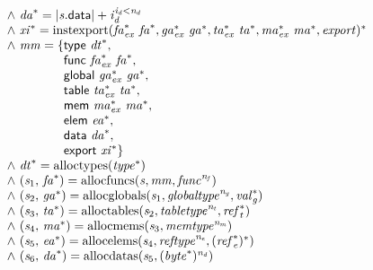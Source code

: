 $$\begin{array}{@{}lcl@{}l@{}}
 &&&\quad {\land}~{{\mathit{da}}^\ast} = {{|{\mathit{s}}.\mathsf{data}|} + {\mathit{i}}_{{\mathit{d}}}^{{\mathit{i}}_{{\mathit{d}}}<{\mathit{n}}_{{\mathit{d}}}}} \\
 &&&\quad {\land}~{{\mathit{xi}}^\ast} = {{\mathrm{instexport}}({{\mathit{fa}}_{{\mathit{ex}}}^\ast}~{{\mathit{fa}}^\ast}, {{\mathit{ga}}_{{\mathit{ex}}}^\ast}~{{\mathit{ga}}^\ast}, {{\mathit{ta}}_{{\mathit{ex}}}^\ast}~{{\mathit{ta}}^\ast}, {{\mathit{ma}}_{{\mathit{ex}}}^\ast}~{{\mathit{ma}}^\ast}, {\mathit{export}})^\ast} \\
 &&&\quad {\land}~{\mathit{mm}} = \{ \begin{array}[t]{@{}l@{}}
\mathsf{type}~{{\mathit{dt}}^\ast},\; \\
  \mathsf{func}~{{\mathit{fa}}_{{\mathit{ex}}}^\ast}~{{\mathit{fa}}^\ast},\; \\
  \mathsf{global}~{{\mathit{ga}}_{{\mathit{ex}}}^\ast}~{{\mathit{ga}}^\ast},\; \\
  \mathsf{table}~{{\mathit{ta}}_{{\mathit{ex}}}^\ast}~{{\mathit{ta}}^\ast},\; \\
  \mathsf{mem}~{{\mathit{ma}}_{{\mathit{ex}}}^\ast}~{{\mathit{ma}}^\ast},\; \\
  \mathsf{elem}~{{\mathit{ea}}^\ast},\; \\
  \mathsf{data}~{{\mathit{da}}^\ast},\; \\
  \mathsf{export}~{{\mathit{xi}}^\ast} \}\end{array} \\
 &&&\quad {\land}~{{\mathit{dt}}^\ast} = {\mathrm{alloctypes}}({{\mathit{type}}^\ast}) \\
 &&&\quad {\land}~({\mathit{s}}_{{1}},\, {{\mathit{fa}}^\ast}) = {\mathrm{allocfuncs}}({\mathit{s}}, {\mathit{mm}}, {{\mathit{func}}^{{\mathit{n}}_{{\mathit{f}}}}}) \\
 &&&\quad {\land}~({\mathit{s}}_{{2}},\, {{\mathit{ga}}^\ast}) = {\mathrm{allocglobals}}({\mathit{s}}_{{1}}, {{\mathit{globaltype}}^{{\mathit{n}}_{{\mathit{g}}}}}, {{\mathit{val}}_{{\mathit{g}}}^\ast}) \\
 &&&\quad {\land}~({\mathit{s}}_{{3}},\, {{\mathit{ta}}^\ast}) = {\mathrm{alloctables}}({\mathit{s}}_{{2}}, {{\mathit{tabletype}}^{{\mathit{n}}_{{\mathit{t}}}}}, {{\mathit{ref}}_{{\mathit{t}}}^\ast}) \\
 &&&\quad {\land}~({\mathit{s}}_{{4}},\, {{\mathit{ma}}^\ast}) = {\mathrm{allocmems}}({\mathit{s}}_{{3}}, {{\mathit{memtype}}^{{\mathit{n}}_{{\mathit{m}}}}}) \\
 &&&\quad {\land}~({\mathit{s}}_{{5}},\, {{\mathit{ea}}^\ast}) = {\mathrm{allocelems}}({\mathit{s}}_{{4}}, {{\mathit{reftype}}^{{\mathit{n}}_{{\mathit{e}}}}}, {({{\mathit{ref}}_{{\mathit{e}}}^\ast})^\ast}) \\
 &&&\quad {\land}~({\mathit{s}}_{{6}},\, {{\mathit{da}}^\ast}) = {\mathrm{allocdatas}}({\mathit{s}}_{{5}}, {({{\mathit{byte}}^\ast})^{{\mathit{n}}_{{\mathit{d}}}}}) \\
\end{array}
$$

